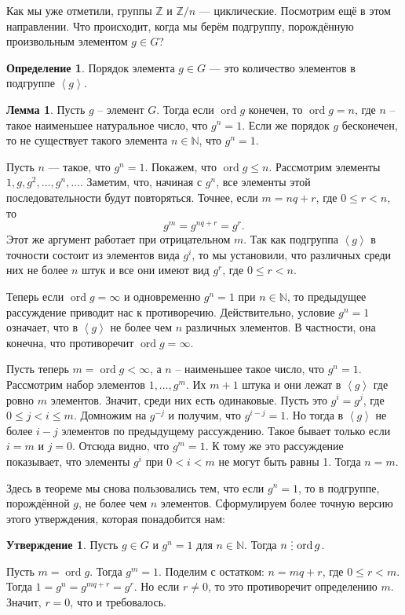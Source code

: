\documentclass[10pt,a4paper,oneside]{book}
\theoremstyle{definition}
\newtheorem*{defn}{\color{yellow!30!red} Определение}
\newtheorem{lem}{\color{green!50!black}Лемма}
\newtheorem{utvr}{\color{blue!50!black}Утверждение}
\renewcommand{\leq}{\leqslant}
\newcommand{\mb}[1]{\mathbb{#1}}
\newcommand{\ord}{\operatorname{ord}}
\newcommand{\di}{\mathop{\,\scalebox{0.85}{\raisebox{-1.2pt}[0.5\height]{\vdots}}\,}}
\def\lan{\left\langle }
\def\ran{\right\rangle}
\def\dfn{\begin{defn}}
\def\edfn{\end{defn}}
\def\lm{\begin{lem}}
\def\elm{\end{lem}}
\def\utv{\begin{utvr}}
\def\eutv{\end{utvr}}
\begin{document}
Как мы уже отметили, группы $\mb Z$ и $\mb Z/n$ --- циклические. Посмотрим ещё в этом направлении. Что происходит, когда мы берём подгруппу, порождённую произвольным элементом $g \in G$? 


\dfn Порядок элемента $g\in G$ --- это количество элементов в подгруппе $\lan g \ran$.
\edfn

\lm Пусть $g$ -- элемент $G$. Тогда если $\ord g$ конечен, то $\ord g=n$, где $n$ -- такое наименьшее натуральное число, что $g^n=1$. Если же порядок $g$ бесконечен, то не существует такого элемента $n\in \mb N$, что $g^n=1$. 
\elm
\proof Пусть $n$ --- такое, что $g^n=1$. Покажем, что $\ord g \leq n$. Рассмотрим элементы $1,g,g^2,\dots,g^n, \dots$. Заметим, что, начиная с $g^n$, все элементы этой последовательности будут повторяться. Точнее, если $m=nq+r$, где $0\leq r<n$, то
$$g^m=g^{nq+r}=g^r.$$
Этот же аргумент работает при отрицательном $m$. Так как подгруппа $\lan g \ran$ в точности состоит из элементов вида $g^i$, то мы установили, что различных среди них не более $n$ штук и все они имеют вид $g^r$, где $0\leq r < n$. 

Теперь если  $\ord g= \infty$ и одновременно $g^n=1$ при $n \in \mb N$, то предыдущее рассуждение приводит нас к противоречию. Действительно, условие $g^n=1$ означает, что в $\lan g\ran$ не более чем $n$ различных элементов. В частности, она конечна, что противоречит  $\ord g= \infty$.

Пусть теперь  $m=\ord g < \infty$, а $n$ -- наименьшее такое число, что $g^n=1$. Рассмотрим набор элементов $1,\dots,g^m$. Их $m+1$ штука и они лежат в $\lan g \ran$ где ровно $m$ элементов. Значит, среди них есть одинаковые. Пусть это $g^i=g^j$, где $0\leq j <i\leq m$. Домножим на $g^{-j}$ и получим, что $g^{i-j}=1$. Но тогда в $\lan g \ran $ не более $i-j$ элементов по предыдущему рассуждению. Такое бывает только если $i=m$ и $j=0$.  Отсюда видно, что $g^m=1$. К тому же это рассуждение показывает, что элементы $g^i$ при $0<i<m$ не могут быть равны 1. Тогда $n=m$. 

\endproof

Здесь в теореме мы снова пользовались тем, что если $g^n=1$, то в подгруппе, порождённой $g$, не более чем $n$ элементов. Сформулируем более точную версию этого утверждения, которая понадобится нам:

\utv Пусть $g\in  G$ и $g^n=1$ для $n\in \mb N$. Тогда $n \di \ord g$.
\eutv
\proof Пусть $m=\ord g$. Тогда $g^m=1$. Поделим с остатком: $n=mq+r$, где $0\leq r < m$. Тогда $1=g^n=g^{mq+r}=g^r$. Но если $r\neq 0$, то это противоречит определению $m$. Значит, $r=0$, что и требовалось.
\endproof
\end{document}
